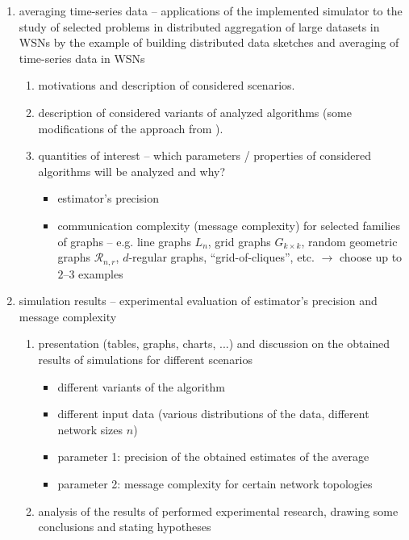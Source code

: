 \documentclass[a4paper, 12pt]{article}
\begin{document}
\begin{enumerate}[label*=\arabic*.]
	\item averaging time-series data -- applications of the implemented simulator to the study of selected problems in distributed aggregation of large datasets in WSNs
		  by the example of building distributed data sketches and averaging of time-series data in WSNs
		  \begin{enumerate}[label*=\arabic*.]
		  	\item motivations and description of considered scenarios.
		  	\item description of considered variants of analyzed algorithms (some modifications of the approach from \cite{Nugroho:2020:AveragingTS}).
		  	\item quantities of interest -- which parameters / properties of considered algorithms will be analyzed and why? 
		  		\begin{itemize}
		  			\item estimator's precision
		  			\item communication complexity (message complexity) for selected families of graphs -- e.g. line graphs $L_n$, grid graphs $G_{k \times k}$,
		  				  random geometric graphs $\mathcal{R}_{n,r}$, 
		  			$d$-regular graphs, ``grid-of-cliques'', etc. $\rightarrow$ choose up to $2$--$3$ examples
		  		\end{itemize} 
		  \end{enumerate} 
	  
	 \item simulation results -- experimental evaluation of estimator's precision and message complexity
		 \begin{enumerate}[label*=\arabic*.]
		 	\item presentation (tables, graphs, charts, ...) and discussion on the obtained results of simulations for different scenarios
		 		\begin{itemize}
		 			\item different variants of the algorithm
		 			\item different input data (various distributions of the data, different network sizes $n$)
		 			\item parameter 1: precision of the obtained estimates of the average
		 			\item parameter 2: message complexity for certain network topologies
		 		\end{itemize}
	 		\item analysis of the results of performed experimental research, drawing some conclusions and stating hypotheses
		 \end{enumerate} 
	 

\end{enumerate}
\end{document}
